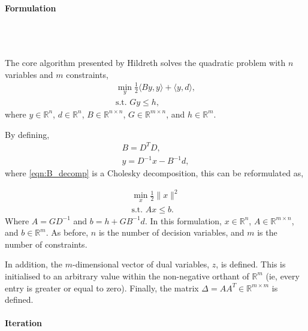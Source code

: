 \paragraph{Formulation}\\\

The core algorithm presented by Hildreth solves the quadratic problem with $n$ variables and $m$ constraints,
\begin{subequations}
\begin{gather}
\min_y \frac{1}{2}\langle By,y \rangle + \langle y,d \rangle, \\
\text{s.t. }Gy \leq h,
\end{gather}
\end{subequations}
where $y\in \mathbb{R}^n$, $d\in \mathbb{R}^n$, $B\in \mathbb{R}^{n\times n}$, $G\in \mathbb{R}^{m\times n}$, and $h\in \mathbb{R}^m$.

By defining, 
\begin{subequations}
\begin{gather}
B=D^TD,\label{eqn:B_decomp}\\
y=D^{-1}x-B^{-1}d,\label{eqn:dual_to_primal}
\end{gather}
\end{subequations}
where \ref{eqn:B_decomp} is a Cholesky decomposition, this can be reformulated as,

\begin{subequations}
\begin{gather}
\min_x \frac{1}{2}\|x\|^2 \\
\text{s.t. } Ax \leq b.
\end{gather}
\end{subequations}
Where $A=GD^{-1}$ and $b = h + GB^{-1}d$. In this formulation, $x\in \mathbb{R}^n$, $A\in \mathbb{R}^{m\times n}$, and $b \in \mathbb{R}^m$. As before, $n$ is the number of decision variables, and $m$ is the number of constraints.

In addition, the $m$-dimensional vector of dual variables, $z$, is defined. This is initialised to an arbitrary value within the non-negative orthant of $\mathbb{R}^m$ (ie, every entry is greater or equal to zero). Finally, the matrix $\Delta = AA^T \in \mathbb{R}^{m\times m}$ is defined.
  
\paragraph{Iteration}\\\

